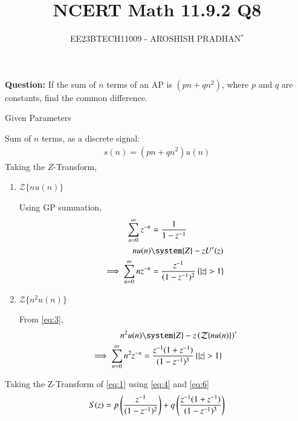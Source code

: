 \documentclass[journal,12pt,twocolumn]{IEEEtran}
\theoremstyle{remark}
\begin{document}

\vspace{3cm}

\title{NCERT Math 11.9.2 Q8}
\author{EE23BTECH11009 - AROSHISH PRADHAN$^{*}$%
}
\maketitle
\newpage
\bigskip
\textbf{Question:} If the sum of $n$ terms of an AP is $(pn + qn^2)$, where $p$ and $q$ are constants, find the common difference.

\solution
\begin{table}[!h]
    \centering
    
    \caption{Given Parameters}
    \label{tab:1}
\end{table}

Sum of $n$ terms, as a discrete signal:
\begin{align}
    s(n) = (pn + qn^2)u(n) \label{eq:1}
\end{align}
Taking the $Z$-Transform,
\begin{enumerate}
    \item $\mathcal{Z}\{nu(n)\}$

Using GP summation, 
\begin{align}
    \sum_{n = 0}^{\infty} z^{-n} &= \frac{1}{1 - z^{-1}}\\
    nu(n) &\system{Z} -zU'(z)\label{eq:3} \\ 
    \implies \sum_{n = 0}^{\infty} nz^{-n} &= \frac{z^{-1}}{(1-z^{-1})^2}\, \{\abs{z} > 1\} \label{eq:4}
\end{align}
\item $\mathcal{Z}{\{n^2 u(n)\}}$

From \eqref{eq:3},
    \begin{align}
        n^2 u(n) &\system{Z} -z\brak{\mathcal{Z}\{nu(n)\}}'\\
        \implies \sum_{n = 0}^{\infty} n^2 z^{-n} &= \frac{z^{-1}(1+z^{-1})}{(1-z^{-1})^3}\, \{\abs{z} > 1\} \label{eq:6}
    \end{align}
\end{enumerate}
Taking the Z-Transform of \eqref{eq:1} using \eqref{eq:4} and \eqref{eq:6}
\begin{align}
      S(z) = p\left(\frac{z^{-1}}{(1-z^{-1})^2}\right) + q\left(\frac{z^{-1}(1 + z^{-1})}{(1-z^{-1})^3}\right)
\end{align}
\end{document}
